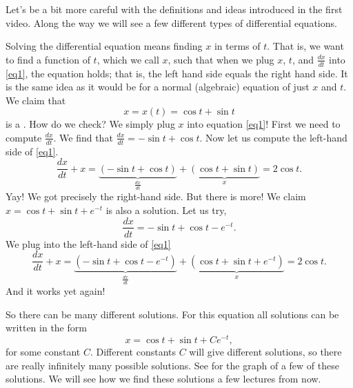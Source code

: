 \begin{video}Let's be a bit more careful with the definitions and ideas introduced in the first video. Along the way we will see a few different types of differential equations. 
\end{video}

Solving the differential equation means finding $x$ in terms of $t$.  That
is, we want to find a function of $t$, which we call $x$, such that when
we plug $x$, $t$, and $\frac{dx}{dt}$ into \eqref{eq1}, the equation holds;
that is, the left hand side equals the right hand side.
It is
the same idea as it would be for a normal (algebraic) equation of just
$x$ and $t$.  We claim that
\begin{equation*}
x = x(t) = \cos t + \sin t
\end{equation*}
is a \emph{}.
How do we check?  We simply plug $x$ into equation \eqref{eq1}!  First we
need to compute $\frac{dx}{dt}$.  We find that $\frac{dx}{dt} = 
-\sin t + \cos t$.  Now let us compute the left-hand side
of \eqref{eq1}.
\begin{equation*}
\frac{dx}{dt} + x = 
\underbrace{(-\sin t + \cos t)}_{\frac{dx}{dt}}
+
\underbrace{(\cos t + \sin t)}_{x}
=
2\cos t .
\end{equation*}
Yay!  We got precisely the right-hand side.
But there is more!
We claim
$x = \cos t + \sin t + e^{-t}$ is also
a solution.  Let us try,
\begin{equation*}
\frac{dx}{dt} = -\sin t + \cos t - e^{-t} .
\end{equation*}
We plug into the left-hand side of \eqref{eq1}
\begin{equation*}
\frac{dx}{dt} + x = 
\underbrace{(-\sin t + \cos t - e^{-t})}_{\frac{dx}{dt}} +
\underbrace{(\cos t + \sin t + e^{-t})}_{x}
= 2\cos t .
\end{equation*}
And it works yet again!

So there can be many different solutions.  For this equation all
solutions can be written in the form
\begin{equation*}
x = \cos t + \sin t + C e^{-t} ,
\end{equation*}
for some constant $C$.  Different constants $C$ will give different
solutions, so there are really infinitely many possible solutions.
See  for the graph of a
few of these solutions. 
We will see how we find these solutions
a few lectures from now.

